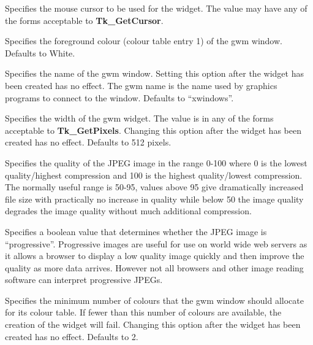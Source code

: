 \begin{rquote}
Specifies the mouse cursor to be used for the widget.
The value may have any of the forms acceptable to {\bf Tk\_GetCursor}.
\end{rquote}

\begin{rquote}
Specifies the foreground colour (colour table entry 1) of the gwm window.
Defaults to White.
\end{rquote}

\begin{rquote}
Specifies the name of the gwm window. Setting
this option after the widget has been created has no effect. The gwm name 
is the name used by graphics programs to connect to the window. Defaults
to ``xwindows''.
\end{rquote}

\begin{rquote}
Specifies the width of the gwm widget. The value is in any of the forms
acceptable to {\bf Tk\_GetPixels}. Changing this option after the widget 
has been created has no effect. Defaults to 512 pixels.
\end{rquote}

\begin{rquote}
Specifies the quality of the JPEG image in the range 0-100 where 0 is the
lowest quality/highest compression and 100 is the highest quality/lowest
compression. The normally useful range is 50-95, values above 95 give 
dramatically increased file size with practically no increase in quality
while below 50 the image quality degrades the image quality without much 
additional compression.
\end{rquote}

\begin{rquote}
Specifies a boolean value that determines whether the JPEG image is
``progressive''. Progressive images are useful for use on world wide web
servers as it allows a browser to display a low quality image quickly and
then improve the quality as more data arrives. However not all browsers
and other image reading software can interpret progressive JPEGs.
\end{rquote}

\begin{rquote}
Specifies the minimum number of colours that the gwm window should allocate 
for its colour table. If fewer than this number of colours are available,
the creation of the widget will fail. Changing this option after the widget
has been created has no effect. Defaults to 2.
\end{rquote}

